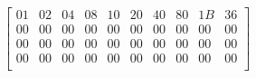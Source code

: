\[
  \begin{bmatrix}
    01 & 02 & 04 & 08 & 10 & 20 & 40 & 80 & 1B & 36 \\
    00 & 00 & 00 & 00 & 00 & 00 & 00 & 00 & 00 & 00 \\
    00 & 00 & 00 & 00 & 00 & 00 & 00 & 00 & 00 & 00 \\
    00 & 00 & 00 & 00 & 00 & 00 & 00 & 00 & 00 & 00 \\
  \end{bmatrix}
\]